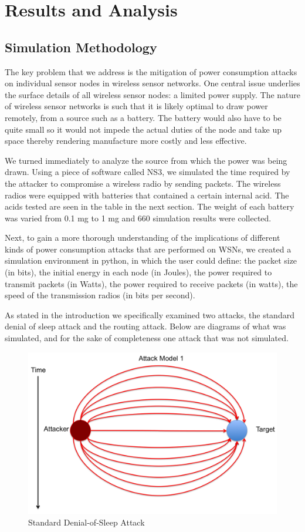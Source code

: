 \section{Results and Analysis}
\subsection{Simulation Methodology}
The key problem that we address is the mitigation of power consumption attacks on individual sensor nodes in wireless sensor networks.  One central issue underlies the surface details of all wireless sensor nodes: a limited power supply. The nature of wireless sensor networks is such that it is likely optimal to draw power remotely, from a source such as a battery. The battery would also have to be quite small so it would not impede the actual duties of the node and take up space thereby rendering manufacture more costly and less effective. 

We turned immediately to analyze the source from which the power was being drawn. Using a piece of software called NS3, we simulated the time required by the attacker to compromise a wireless radio by sending packets. The wireless radios were equipped with batteries that contained a certain internal acid. The acids tested are seen in the table in the next section. The weight of each battery was varied from 0.1 mg to 1 mg and 660 simulation results were collected. 

Next, to gain a more thorough understanding of the implications of different kinds of power consumption attacks that are performed on WSNs, we created a simulation environment in python, in which the user could define: the packet size (in bits), the initial energy in each node (in Joules), the power required to transmit packets (in Watts), the power required to receive packets (in watts), the speed of the transmission radios (in bits per second). 

As stated in the introduction we specifically examined two attacks, the standard denial of sleep attack and the routing attack. Below are diagrams of what was simulated, and for the sake of completeness one attack that was not simulated.

\begin{figure}[H]
\caption{Standard Denial-of-Sleep Attack}
\includegraphics[width = \linewidth]{Figures/AModel1.png}
\end{figure}


